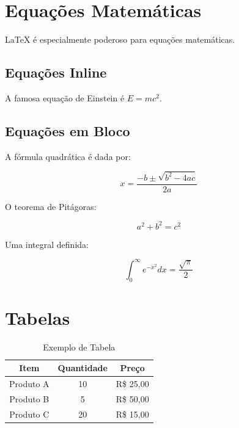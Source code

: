 \documentclass[12pt, a4paper]{article}
\begin{document}
\section{Equações Matemáticas}

\LaTeX{} é especialmente poderoso para equações matemáticas.

\subsection{Equações Inline}

A famosa equação de Einstein é $E = mc^2$.

\subsection{Equações em Bloco}

A fórmula quadrática é dada por:

\begin{equation}
    x = \frac{-b \pm \sqrt{b^2 - 4ac}}{2a}
    \label{eq:quadratica}
\end{equation}

O teorema de Pitágoras:

\begin{equation}
    a^2 + b^2 = c^2
\end{equation}

Uma integral definida:

\begin{equation}
    \int_0^{\infty} e^{-x^2} dx = \frac{\sqrt{\pi}}{2}
\end{equation}

\section{Tabelas}

\begin{table}[h]
    \centering
    \caption{Exemplo de Tabela}
    \begin{tabular}{|c|c|c|}
        \hline
        \textbf{Item} & \textbf{Quantidade} & \textbf{Preço} \\
        \hline
        Produto A & 10 & R\$ 25,00 \\
        Produto B & 5 & R\$ 50,00 \\
        Produto C & 20 & R\$ 15,00 \\
        \hline
    \end{tabular}
    \label{tab:exemplo}
\end{table}
\end{document}
